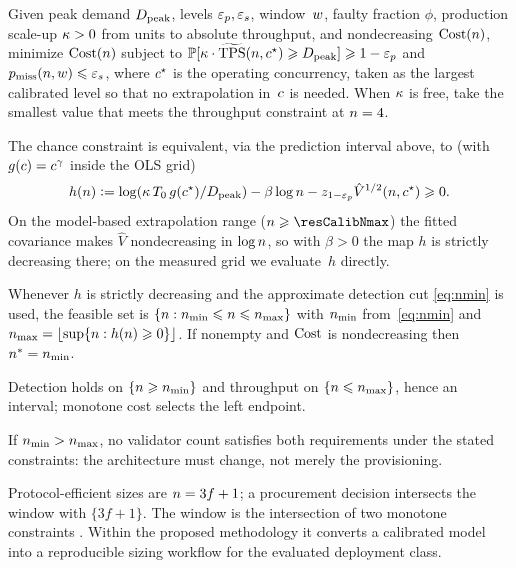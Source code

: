 \begin{Problem}
\label{prob:sizing}
Given peak demand $D_{\mathrm{peak}}$, levels $\varepsilon_{p},\varepsilon_{s}$, window~$w$, faulty fraction
$\phi$, production scale-up $\kappa>0$ from \RNM{} units to absolute
throughput, and nondecreasing $\mathrm{Cost}(n)$, minimize $\mathrm{Cost}(n)$ subject to
$\mathbb{P}[\kappa\cdot\widetilde{\mathrm{TPS}}(n,c^{\star})\geqslant D_{\mathrm{peak}}]\geqslant1-\varepsilon_{p}$ and
$p_{\mathrm{miss}}(n,w)\leqslant\varepsilon_{s}$, where $c^{\star}$ is the operating concurrency, taken
as the largest calibrated level so that no extrapolation in~$c$ is needed. When $\kappa$
is free, take the smallest value that meets the throughput constraint at
$n=4$.
\end{Problem}

The chance constraint is equivalent, via the prediction interval above, to
(with $g(c)=c^{\gamma}$ inside the OLS grid)
\begin{equation}
h(\n)\eqdef\log(\kappaScale\,\Tzero\,\gfun(\cc^{\star})/\Dpk)
-\beta\log\n-\zq_{1-\epsp}\hat{V}^{1/2}(\n,\cc^{\star})\ge0.
\label{eq:h}
\end{equation}
On the model-based extrapolation range ($\n\ge\resCalibNmax$) the fitted
covariance makes $\hat{V}$ nondecreasing in $\log n$, so with
$\beta>0$ the map $h$ is strictly decreasing there; on the measured grid we
evaluate~$h$ directly.

\begin{Proposition}
\label{prop:window}
Whenever $h$ is strictly decreasing and the approximate detection cut
\eqref{eq:nmin} is used, the feasible set is
$\{\n:\nmin\le\n\le\nmax\}$ with $\nmin$ from~\eqref{eq:nmin} and
$\nmax=\lfloor\sup\{\n:h(\n)\ge0\}\rfloor$. If nonempty and $\mathrm{Cost}$ is
nondecreasing then $\nopt=\nmin$.
\end{Proposition}

\begin{Proof}
Detection holds on $\{\n\ge\nmin\}$ and throughput on $\{\n\le\nmax\}$, hence an
interval; monotone cost selects the left endpoint.
\end{Proof}

\begin{Corollary}
\label{cor:infeasible}
If $\nmin>\nmax$, no validator count satisfies both requirements under the
stated constraints: the architecture must change, not merely the provisioning.
\end{Corollary}

Protocol-efficient sizes are $n=3f+1$; a procurement decision intersects the
window with $\{3f+1\}$. The
window is the intersection of two monotone constraints
\cite{charnes1959,nemirovski2007}. Within the proposed methodology it converts
a calibrated model into a reproducible sizing workflow for the evaluated
deployment class.
